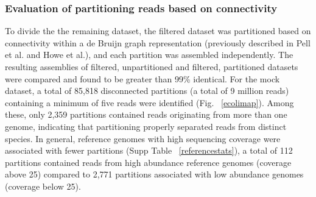 \documentclass[11pt]{article} %
\begin{document}
\subsubsection{Evaluation of partitioning reads based on connectivity}
To divide the the remaining dataset, the filtered dataset was partitioned based on connectivity within a de Bruijn graph representation (previously described in Pell et al. and Howe et al.), and each partition was assembled independently.  The resulting assemblies of filtered, unpartitioned and filtered, partitioned datasets were compared and found to be greater than 99\% identical.  For the mock dataset, a total of 85,818 disconnected partitions (a total of 9 million reads) containing a minimum of five reads were identified (Fig. ~\ref{ecolimap}).  Among these, only 2,359 partitions contained reads originating from more than one genome, indicating that partitioning properly separated reads from distinct species.
In general, reference genomes with high sequencing coverage were associated with fewer partitions (Supp Table ~\ref{referencestats}), a total of 112 partitions contained reads from high abundance reference genomes (coverage above 25) compared to 2,771 partitions associated with low abundance genomes (coverage below 25).   %
\end{document}
